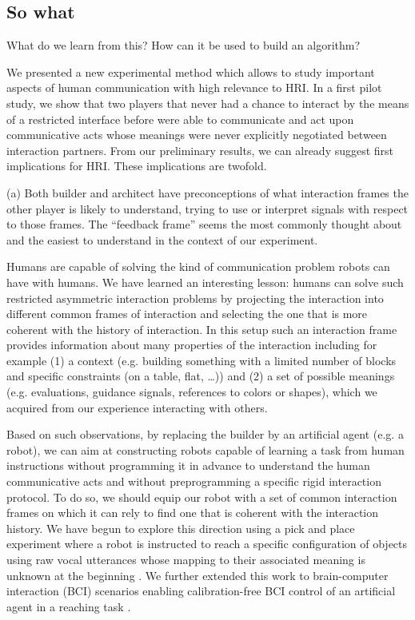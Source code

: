 \subsection{So what}

What do we learn from this? 
How can it be used to build an algorithm?

We presented a new experimental method which allows to study important aspects of human communication with high relevance to HRI.
In a first pilot study, we show that two players that never had a chance to interact by the means of a restricted interface before were able to communicate and act upon communicative acts whose meanings were never explicitly negotiated between interaction partners. From our preliminary results, we can already suggest first implications for HRI. These implications are twofold.

(a) Both builder and architect have preconceptions of what interaction frames the other player is likely to understand, trying to use or interpret signals with respect to those frames. The ``feedback frame'' seems the most commonly thought about and the easiest to understand in the context of our experiment.

Humans are capable of solving the kind of communication problem robots can have with humans. We have learned an interesting lesson: humans can solve such restricted asymmetric interaction problems by projecting the interaction into different common frames of interaction and selecting the one that is more coherent with the history of interaction. In this setup such an interaction frame provides information about many properties of the interaction including for example (1) a context (e.g. building something with a limited number of blocks and specific constraints (on a table, flat, \ldots)) and (2) a set of possible meanings (e.g. evaluations, guidance signals, references to colors or shapes), which we acquired from our experience interacting with others. 

Based on such observations, by replacing the builder by an artificial agent (e.g. a robot), we can aim at constructing robots capable of learning a task from human instructions without programming it in advance to understand the human communicative acts and without preprogramming a specific rigid interaction protocol. To do so, we should equip our robot with a set of common interaction frames on which it can rely to find one that is coherent with the interaction history. We have begun to explore this direction using a pick and place experiment where a robot is instructed to reach a specific configuration of objects using raw vocal utterances whose mapping to their associated meaning is unknown at the beginning \cite{grizou2013robot}. We further extended this work to brain-computer interaction (BCI) scenarios enabling calibration-free BCI control of an artificial agent in a reaching task \cite{grizou2014calibration}.


